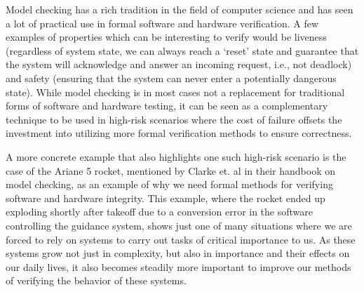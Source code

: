Model checking has a rich tradition in the field of computer science and has seen a lot of practical use in formal software and hardware verification. A few examples of properties which can be interesting to verify would be liveness (regardless of system state, we can always reach a `reset' state and guarantee that the system will acknowledge and answer an incoming request, i.e., not deadlock) and safety (ensuring that the system can never enter a potentially dangerous state). While model checking is in most cases not a replacement for traditional forms of software and hardware testing, it can be seen as a complementary technique to be used in high-risk scenarios where the cost of failure offsets the investment into utilizing more formal verification methods to ensure correctness.

A more concrete example that also highlights one such high-risk scenario is the case of the Ariane 5 rocket, mentioned by Clarke et. al \cite{Clarke1999} in their handbook on model checking, as an example of why we need formal methods for verifying software and hardware integrity. This example, where the rocket ended up exploding shortly after takeoff due to a conversion error in the software controlling the guidance system, shows just one of many situations where we are forced to rely on systems to carry out tasks of critical importance to us. As these systems grow not just in complexity, but also in importance and their effects on our daily lives, it also becomes steadily more important to improve our methods of verifying the behavior of these systems. 

